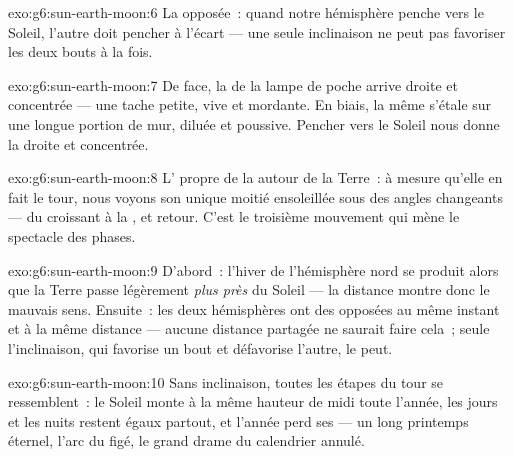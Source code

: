 \begin{solution}{exo:g6:sun-earth-moon:6}
La  opposée~: quand notre hémisphère penche vers le Soleil,
l'autre doit pencher à l'écart --- une seule inclinaison ne peut pas
favoriser les deux bouts à la fois.
\end{solution}

\begin{solution}{exo:g6:sun-earth-moon:7}
De face, la  de la lampe de poche arrive droite et
concentrée --- une tache petite, vive et mordante. En biais, la même
 s'étale sur une longue portion de mur, diluée et poussive.
Pencher vers le Soleil nous donne la  droite et concentrée.
\end{solution}

\begin{solution}{exo:g6:sun-earth-moon:8}
L' propre de la  autour de la Terre~: à mesure qu'elle en
fait le tour, nous voyons son unique moitié ensoleillée sous des
angles changeants --- du croissant à la , et retour. C'est
le troisième mouvement qui mène le spectacle des phases.
\end{solution}

\begin{solution}{exo:g6:sun-earth-moon:9}
D'abord~: l'hiver de l'hémisphère nord se produit alors que la Terre
passe légèrement \emph{plus près} du Soleil --- la distance montre
donc le mauvais sens. Ensuite~: les deux hémisphères ont des 
opposées au même instant et à la même distance --- aucune distance
partagée ne saurait faire cela~; seule l'inclinaison, qui favorise un
bout et défavorise l'autre, le peut.
\end{solution}

\begin{solution}{exo:g6:sun-earth-moon:10}
Sans inclinaison, toutes les étapes du tour se ressemblent~: le
Soleil monte à la même hauteur de midi toute l'année, les jours et
les nuits restent égaux partout, et l'année perd ses  --- un
long printemps éternel, l'arc du  figé, le grand drame
du calendrier annulé.
\end{solution}

